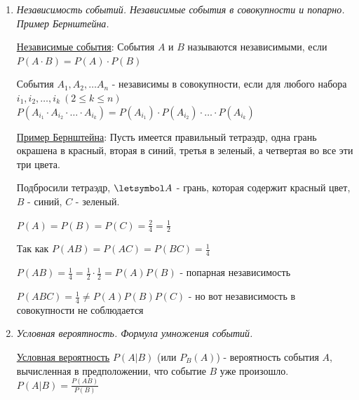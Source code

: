 \documentclass[12pt]{article}
\begin{document}
\begin{enumerate}
    \hyperlink{probabilityoperationsproperties}{Свойства операций сложения и умножения}:

    \begin{enumerate}
        \item Свойство дистрибутивности: $A \cdot (B + C) = AB + AC$

        \item Формула сложения: если $A$ и $B$ несовместны, то $P(A + B) = P(A) + P(B)$

        \item Формула сложения вероятностей: $P(A + B) = P(A) + P(B) - P(AB)$
    \end{enumerate}

    \item \textit{Независимость событий. Независимые события в совокупности и попарно. Пример Бернштейна. }

    \hyperlink{independantevents}{Независимые события}: События $A$ и $B$ называются независимыми, если $P(A \cdot B) = P(A) \cdot P(B)$

    События $A_1, A_2, \dots A_n$ - независимы в совокупности, если для любого набора $i_1, i_2, \dots, i_k \ (2 \leq k \leq n)$
    $P(A_{i_1} \cdot A_{i_2} \cdot \dots \cdot A_{i_k}) = P(A_{i_1}) \cdot P(A_{i_2}) \cdot \dots \cdot P(A_{i_k})$

    \hyperlink{bernshteinsexample}{Пример Бернштейна}: Пусть имеется правильный тетраэдр, одна грань окрашена в красный, вторая в синий, третья в зеленый, а четвертая во все эти три цвета.

    Подбросили тетраэдр, $\letsymbol A$ - грань, которая содержит красный цвет, $B$ - синий, $C$ - зеленый.

    $P(A) = P(B) = P(C) = \frac{2}{4} = \frac{1}{2}$

    Так как $P(AB) = P(AC) = P(BC) = \frac{1}{4}$

    $P(AB) = \frac{1}{4} = \frac{1}{2} \cdot \frac{1}{2} = P(A) P(B)$ - попарная независимость

    $P(ABC) = \frac{1}{4} \neq P(A) P(B) P(C)$ - но вот независимость в совокупности не соблюдается

    \item \textit{Условная вероятность. Формула умножения событий.}

    \hyperlink{conditionalprobability}{Условная вероятность} $P(A|B)$ (или $P_B(A)$) - вероятность события $A$, вычисленная в предположении, что событие $B$ уже произошло. $P(A|B) = \frac{P(AB)}{P(B)}$


\end{enumerate}
\end{document}
